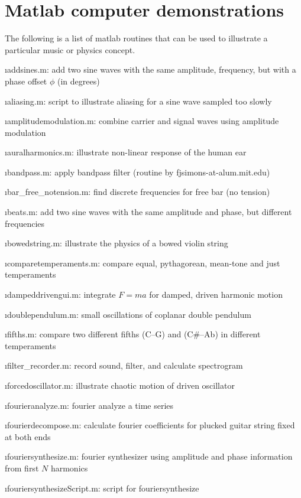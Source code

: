 \section{Matlab computer demonstrations}

The following is a list of matlab routines that can be used to 
illustrate a particular music or physics concept.

\bi

\i addsines.m: 
add two sine waves with the same amplitude, frequency, 
but with a phase offset $\phi$ (in degrees)

\i aliasing.m: 
script to illustrate aliasing for a sine wave sampled too slowly

\i amplitudemodulation.m:
combine carrier and signal waves using amplitude modulation

\i auralharmonics.m:
illustrate non-linear response of the human ear

\i bandpass.m:
apply bandpass filter 
(routine by fjsimons-at-alum.mit.edu)

\i bar\_free\_notension.m:
find discrete frequencies for free bar (no tension)

\i beats.m:
add two sine waves with the same amplitude and phase,
but different frequencies

\i bowedstring.m:
illustrate the physics of a bowed violin string

\i comparetemperaments.m:
compare equal, pythagorean, mean-tone and just temperaments
 
\i dampeddrivengui.m:
integrate $F = ma$ for damped, driven harmonic motion

\i doublependulum.m:
small oscillations of coplanar double pendulum

\i fifths.m:
compare two different fifths (C--G) and (C\#--Ab) in different temperaments

\i filter\_recorder.m:
record sound, filter, and calculate spectrogram

\i forcedoscillator.m:
illustrate chaotic motion of driven oscillator

\i fourieranalyze.m:
fourier analyze a time series

\i fourierdecompose.m:
calculate fourier coefficients for plucked guitar string fixed at both ends

\i fouriersynthesize.m:
fourier synthesizer using amplitude and phase information from first $N$ harmonics

\i fouriersynthesizeScript.m:
script for fouriersynthesize


